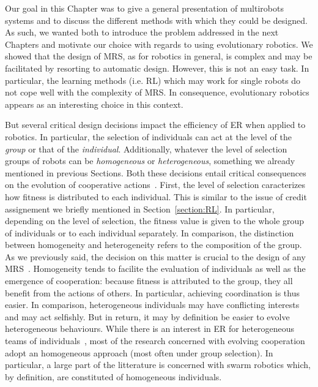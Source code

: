   Our goal in this Chapter was to give a general presentation of multirobots systems and to discuss the different methods with which they could be designed. As such, we wanted both to introduce the problem addressed in the next Chapters and motivate our choice with regards to using evolutionary robotics. We showed that the design of MRS, as for robotics in general, is complex and may be facilitated by resorting to automatic design. However, this is not an easy task. In particular, the learning methods (i.e. RL) which may work for single robots do not cope well with the complexity of MRS. In consequence, evolutionary robotics appears as an interesting choice in this context.

  But several critical design decisions impact the efficiency of ER when applied to robotics. In particular, the selection of individuals can act at the level of the \emph{group} or that of the \emph{individual}. Additionally, whatever the level of selection groups of robots can be \emph{homogeneous} or \emph{heterogeneous}, something we already mentioned in previous Sections. Both these decisions entail critical consequences on the evolution of cooperative actions~\parencite{Waibel2009}. First, the level of selection caracterizes how fitness is distributed to each individual. This is similar to the issue of credit assignement we briefly mentioned in Section~\ref{section:RL}. In particular, depending on the level of selection, the fitness value is given to the whole group of individuals or to each individual separately. In comparison, the distinction between homogeneity and heterogeneity refers to the composition of the group. As we previously said, the decision on this matter is crucial to the design of any MRS~\parencite{Quinn2003}. Homogeneity tends to facilite the evaluation of individuals as well as the emergence of cooperation: because fitness is attributed to the group, they all benefit from the actions of others. In particular, achieving coordination is thus easier. In comparison, heterogeneous individuals may have conflicting interests and may act selfishly. But in return, it may by definition be easier to evolve heterogeneous behaviours. While there is an interest in ER for heterogeneous teams of individuals~\parencite{Lichocki2013}, most of the research concerned with evolving cooperation adopt an homogeneous approach (most often under group selection). In particular, a large part of the litterature is concerned with swarm robotics which, by definition, are constituted of homogeneous individuals.

